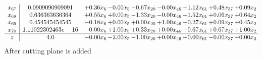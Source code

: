 \documentclass[8pt]{article}
\begin{document}
\[\begin{array}{c| c c@{\hskip 2pt} c@{\hskip 2pt} c@{\hskip 2pt} c@{\hskip 2pt} c@{\hskip 2pt} c@{\hskip 2pt} c@{\hskip 2pt} }
 x_{67}   &  0.0909090909091 & +  0.36 x_{6} & -0.00 x_{5} & -0.67 x_{20} & -0.00 x_{46} & +  1.12 x_{61} & +  0.48 x_{37} & +  0.09 x_{2}\\
 x_{68}   &  0.636363636364 & +  0.55 x_{6} & +  0.00 x_{5} & -1.33 x_{20} & -0.00 x_{46} & +  1.52 x_{61} & +  0.06 x_{37} & +  0.64 x_{2}\\
 x_{69}   &  0.454545454545 & -0.18 x_{6} & +  0.00 x_{5} & +  0.00 x_{20} & +  1.00 x_{46} & +  0.27 x_{61} & +  0.09 x_{37} & +  0.45 x_{2}\\
 x_{70}   &  1.11022302463e-16 & -0.00 x_{6} & +  1.00 x_{5} & +  0.33 x_{20} & +  0.00 x_{46} & +  0.67 x_{61} & +  0.67 x_{37} & +  1.00 x_{2}\\
\hline
z    &  4.0 & -0.00 x_{6} & -2.00 x_{5} & -1.00 x_{20} & +  0.00 x_{46} & +  0.00 x_{61} & -0.00 x_{37} & -0.00 x_{2}\\
\end{array}\]
 After cutting plane is added 
\end{document}

